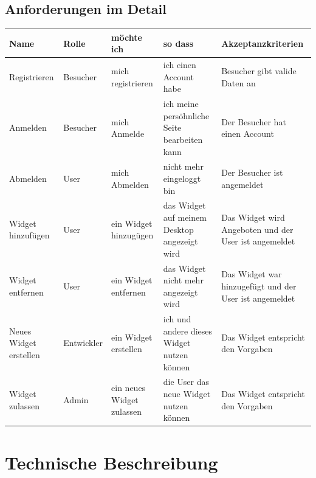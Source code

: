 	\subsection{Anforderungen im Detail}
		
		\begin{center}
			\begin{tabular}{ | p{2cm} | p{2cm} | p{3cm} | p{3cm} | p{4cm} |}
				\hline
				\textbf{Name} & \textbf{Rolle} & \textbf{möchte ich} & \textbf{so dass} & \textbf{Akzeptanzkriterien}\\ \hline
				Registrieren & Besucher & mich registrieren & ich einen Account habe & Besucher gibt valide Daten an \\  \hline
				Anmelden & Besucher & mich Anmelde & ich meine persöhnliche \newline Seite bearbeiten kann & Der Besucher hat einen Account \\  \hline
				Abmelden & User & mich Abmelden & nicht mehr eingeloggt bin & Der Besucher ist angemeldet \\ \hline
				Widget hinzufügen & User & ein Widget hinzugügen & das Widget auf meinem Desktop angezeigt wird & Das Widget wird Angeboten und der User ist angemeldet \\ \hline
				Widget entfernen & User & ein Widget entfernen & das Widget nicht mehr angezeigt wird & Das Widget war hinzugefügt und der User ist angemeldet \\ \hline
				Neues Widget erstellen & Entwickler & ein Widget erstellen & ich und andere dieses Widget nutzen können & Das Widget entspricht den Vorgaben \\ \hline
				Widget zulassen & Admin & ein neues Widget zulassen & die User das neue Widget nutzen können & Das Widget entspricht den Vorgaben \\				
				\hline
			\end{tabular}
		\end{center}

\newpage
\section{Technische Beschreibung}
	
